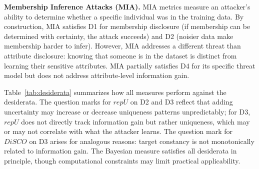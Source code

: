 \documentclass[Afour,sageh,times,doublespace]{sagej}
\begin{document}
\textbf{Membership Inference Attacks (MIA).} MIA metrics \citep{Shokri2017, Stadler2022} measure an attacker's ability to determine whether a specific individual was in the training data. By construction, MIA satisfies D1 for membership disclosure (if membership can be determined with certainty, the attack succeeds) and D2 (noisier data make membership harder to infer). However, MIA addresses a different threat than attribute disclosure: knowing that someone is in the dataset is distinct from learning their sensitive attributes. MIA partially satisfies D4 for its specific threat model but does not address attribute-level information gain.

Table~\ref{tab:desiderata} summarizes how all measures perform against the desiderata. The question marks for $repU$ on D2 and D3 reflect that adding uncertainty may increase or decrease uniqueness patterns unpredictably; for D3, $repU$ does not directly track information gain but rather uniqueness, which may or may not correlate with what the attacker learns. The question mark for $DiSCO$ on D3 arises for analogous reasons: target constancy is not monotonically related to information gain. The Bayesian measure satisfies all desiderata in principle, though computational constraints may limit practical applicability.

\begin{table}[h]
\footnotesize\sf\centering
\caption{Evaluation of measures against desiderata. Checkmarks indicate the property is satisfied; crosses indicate known violations; question marks indicate context-dependent or ambiguous relationships; $\sim$ indicates partial satisfaction. See text for discussion.\label{tab:desiderata}}
\end{table}
\end{document}
